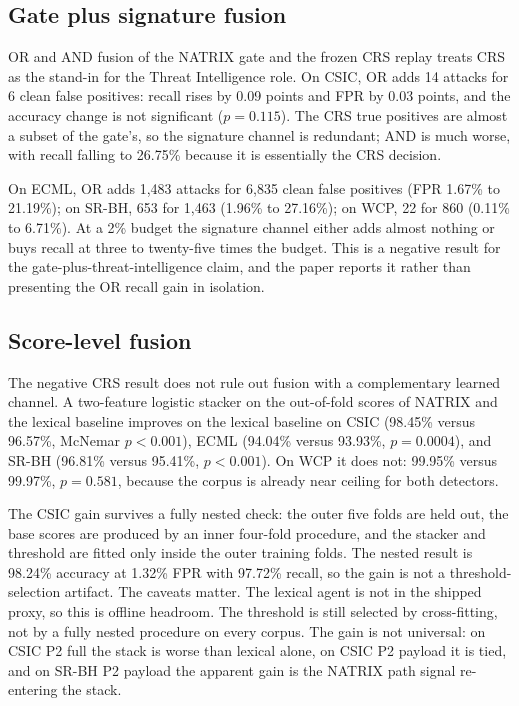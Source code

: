 \documentclass[preprint,11pt]{elsarticle}
\begin{document}
\subsection{Gate plus signature
fusion}\label{gate-plus-signature-fusion}

OR and AND fusion of the NATRIX gate and the frozen CRS replay treats
CRS as the stand-in for the Threat Intelligence role. On CSIC, OR adds
14 attacks for 6 clean false positives: recall rises by 0.09 points and
FPR by 0.03 points, and the accuracy change is not significant
(\(p=0.115\)). The CRS true positives are almost a subset of the gate's,
so the signature channel is redundant; AND is much worse, with recall
falling to 26.75\% because it is essentially the CRS decision.

On ECML, OR adds 1,483 attacks for 6,835 clean false positives (FPR
1.67\% to 21.19\%); on SR-BH, 653 for 1,463 (1.96\% to 27.16\%); on WCP,
22 for 860 (0.11\% to 6.71\%). At a 2\% budget the signature channel
either adds almost nothing or buys recall at three to twenty-five times
the budget. This is a negative result for the
gate-plus-threat-intelligence claim, and the paper reports it rather
than presenting the OR recall gain in isolation.

\subsection{Score-level fusion}\label{score-level-fusion}

The negative CRS result does not rule out fusion with a complementary
learned channel. A two-feature logistic stacker on the out-of-fold
scores of NATRIX and the lexical baseline improves on the lexical
baseline on CSIC (98.45\% versus 96.57\%, McNemar \(p<0.001\)), ECML
(94.04\% versus 93.93\%, \(p=0.0004\)), and SR-BH (96.81\% versus
95.41\%, \(p<0.001\)). On WCP it does not: 99.95\% versus 99.97\%,
\(p=0.581\), because the corpus is already near ceiling for both
detectors.

The CSIC gain survives a fully nested check: the outer five folds are
held out, the base scores are produced by an inner four-fold procedure,
and the stacker and threshold are fitted only inside the outer training
folds. The nested result is 98.24\% accuracy at 1.32\% FPR with 97.72\%
recall, so the gain is not a threshold-selection artifact. The caveats
matter. The lexical agent is not in the shipped proxy, so this is
offline headroom. The threshold is still selected by cross-fitting, not
by a fully nested procedure on every corpus. The gain is not universal:
on CSIC P2 full the stack is worse than lexical alone, on CSIC P2
payload it is tied, and on SR-BH P2 payload the apparent gain is the
NATRIX path signal re-entering the stack.
\end{document}
